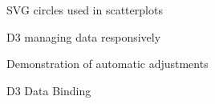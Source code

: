 \documentclass[a4paper,11pt,titlepage]{article}
\begin{document}
	\begin{figure}[H]
    			\caption{SVG circles used in scatterplots}%
	\end{figure}	
	
	\begin{figure}[H]
    			\caption{D3 managing data responsively}%
	\end{figure}	
	
	\begin{figure}[H]
    			\caption{Demonstration of automatic adjustments}%
	\end{figure}	
	
	\begin{figure}[H]
    			\caption{D3 Data Binding}%
	\end{figure}	
	
\end{document}
